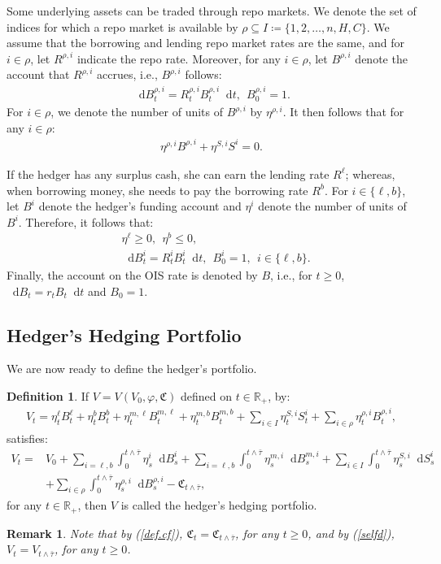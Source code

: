 \documentclass[a4paper, 11pt]{article}              %
\numberwithin{equation}{section}
\theoremstyle{plain}
\newcommand{\btau}{\bar{\tau}}
\newcommand{\1}{\mathds{1}}
\newcommand{\frC}{\mathfrak{C}}
\newcommand{\dsR}{\mathbb{R}}
\newcommand{\SUM}{\displaystyle\sum}
\newcommand{\IT}{^i_t}
\newcommand{\IS}{^i_s}
\theoremstyle{plain}
\newtheorem{definition}[thm]{Definition}
\theoremstyle{definition}
\newtheorem{remark}[thm]{Remark} %
\newtheorem{definition}{Definition}
\theoremstyle{plain}
\newtheorem{remark}{Remark}
\newcommand*\df{\mathop{}\!\mathrm{d}}
\begin{document}
Some underlying assets can be traded through repo markets. We denote the set of
indices  for which a repo market is available by
$ \rho \subseteq I \coloneqq \{1, 2, \dots, n, H, C\}$. We assume that the borrowing and
lending repo market rates are the same, and for $i \in \rho$, let $R^{\rho, i}$ indicate
the repo rate. Moreover, for any $i \in\rho$, let $B^{\rho, i}$ denote the account that
$R^{\rho, i}$ accrues, i.e., $B^{\rho, i}$ follows:
\begin{align}
\df B^{\rho, i}_t = R^{\rho, i}_tB^{\rho, i}_t\df t, ~~B^{\rho, i}_0=1. \label{sde:repo}
\end{align}
For $i \in \rho$, we denote  the number of units of $B^{\rho, i}$ by $\eta^{\rho, i}$. It then
follows that for any $i \in \rho$:
\begin{align}
 \eta^{\rho, i}B^{\rho, i} + \eta^{S, i}S^{i} = 0.\label{cond:repo}
\end{align}

If the hedger has any surplus cash, she can earn the  lending rate $R^\ell$;
whereas, when
borrowing money, she needs to pay the borrowing rate $R^b$. For $i \in
\{\ell, b\}$, let $B^i$ denote the hedger's funding account and $\eta^i$ denote the
number of units of $B^i$. Therefore, it follows that:
\begin{eqnarray}
  & \eta^\ell \geq0, ~~\eta ^b \leq 0, \\
  &\df B^i_t = R^i_tB^i_t\df t, ~~B^i_0=1, ~~i\in \{\ell, b\}. \label{sde:funding}
\end{eqnarray}
Finally, the account on the OIS rate is denoted by $B$, i.e., for $t\geq0$, $\df B_t =
r_t B_t \df t$ and $B_0=1$. 
\subsection{Hedger's Hedging Portfolio}
We are now ready to define the hedger's portfolio. 
\begin{definition} \label{def:iself}
If $V=V(V_0, \varphi, \frC)$ defined on $t \in \dsR_+$, by:
\begin{align}
  V_t = \eta^{\ell}_tB^\ell_t +\eta^{b}_tB^b_t+ \eta^{m,\ell}_tB^{m, \ell}_t+\eta^{m, b}_tB^{m, b}_t
  +\SUM_{i \in I}\eta^{S, i}_t  S\IT+\SUM_{i \in \rho}\eta^{\rho, i}_t B^{\rho, i}_t, \label{self}
\end{align}
satisfies:
\begin{align}
  V_t =& V_0 +\SUM_{i =\ell, b}\int_{0}^{t \wedge \btau}\eta^{i}_s\df B^i_s
         + \SUM_{i =\ell, b}\int_{0}^{t \wedge \btau}\eta^{m,i}_s\df B^{m, i}_s +\SUM_{i \in
         I}\int_{0}^{t \wedge \btau}\eta^{S, i}_s  \df S\IS \nonumber\\
       &+\SUM_{i \in \rho}\int_{0}^{t \wedge \btau}\eta^{\rho, i}_s \df B^{\rho, i}_s
         - \frC_{t\wedge \btau},
    \label{selfd}
\end{align}
for any $t \in \dsR_+$, then $V$ is called the hedger's hedging
  portfolio. 
\end{definition}
\begin{remark}
 Note that by (\ref{def.cf}),  $\frC_t = \frC_{t \wedge\btau}$, for any $ t \geq0$, and by
 (\ref{selfd}), $V_t = V_{t \wedge \btau}$, for any $ t \geq0$. 
\end{remark}
\end{document}
